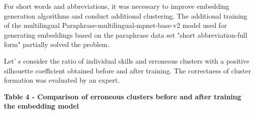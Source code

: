 \begin{multicols}{2}
For short words and abbreviations, it was necessary to improve embedding
generation algorithms and conduct additional clustering. The additional
training of the multilingual Paraphrase-multilingual-mpnet-base-v2 model
used for generating embeddings based on the paraphrase data set "short
abbreviation-full form" partially solved the problem.

Let' s consider the ratio of individual skills and
erroneous clusters with a positive silhouette coefficient obtained
before and after training. The correctness of cluster formation was
evaluated by an expert.
\end{multicols}

{\bfseries Table 4 - Comparison of erroneous clusters before and after
training the embedding model}


